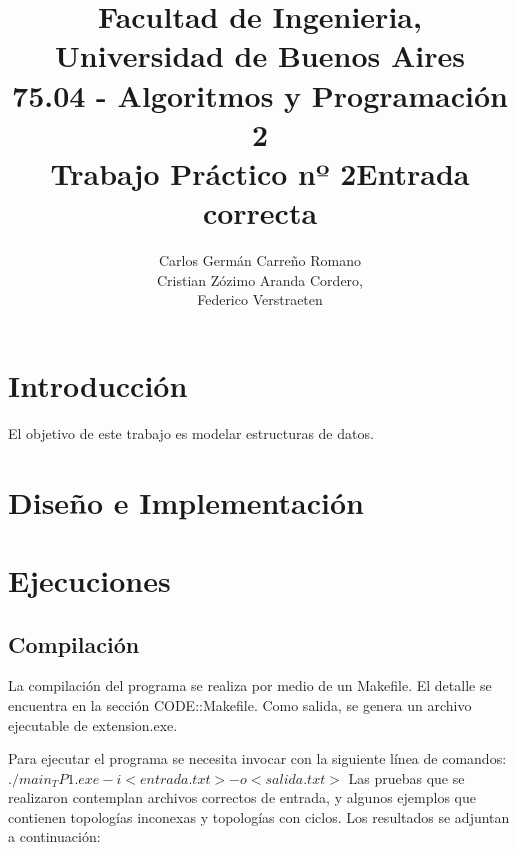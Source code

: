 \documentclass[10pt,a4paper]{article}
\title{Facultad de Ingenieria,\\
 Universidad de Buenos Aires\\
 75.04 - Algoritmos y Programación 2\\
Trabajo Práctico nº 2}
\author{Carlos Germán Carreño Romano\\
Cristian Zózimo Aranda Cordero,\\
Federico Verstraeten}
\begin{document}
\maketitle
\newpage
\tableofcontents
\newpage
\section{Introducción}
El objetivo de este trabajo es modelar estructuras de datos.\\

\section{Diseño e Implementación}



\section{Ejecuciones}


\subsection{Compilación}

La compilación del programa se realiza por medio de un Makefile. El detalle se encuentra en la sección CODE::Makefile. Como salida, se genera un archivo ejecutable de extension.exe.

Para ejecutar el programa se necesita invocar con la siguiente línea de comandos:
\texttt{$./main_TP1.exe -i <entrada.txt> -o <salida.txt>$}
Las pruebas que se realizaron contemplan archivos correctos de entrada, y algunos ejemplos que contienen topologías inconexas y topologías con ciclos. Los resultados se adjuntan a continuación:\\
\title{\textbf{Entrada correcta}}\\
\end{document}
